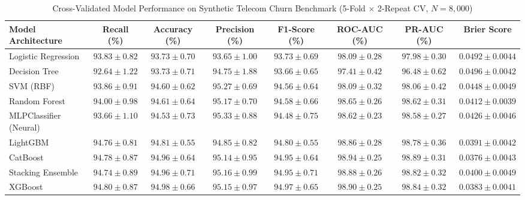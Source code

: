 \begin{table}[t]
\caption{Cross-Validated Model Performance on Synthetic Telecom Churn Benchmark (5-Fold $\times$ 2-Repeat CV, $N=8,000$)}
\label{tab:phase2_metrics}
\centering
\begin{tabular}{lccccccc}
\toprule
\textbf{Model Architecture} & \textbf{Recall (\%)} & \textbf{Accuracy (\%)} & \textbf{Precision (\%)} & \textbf{F1-Score (\%)} & \textbf{ROC-AUC (\%)} & \textbf{PR-AUC (\%)} & \textbf{Brier Score} \\
\midrule
Logistic Regression         & $93.83 \pm 0.82$ & $93.73 \pm 0.70$ & $93.65 \pm 1.00$ & $93.73 \pm 0.69$ & $98.09 \pm 0.28$ & $97.98 \pm 0.30$ & $0.0492 \pm 0.0044$ \\
Decision Tree               & $92.64 \pm 1.22$ & $93.73 \pm 0.71$ & $94.75 \pm 1.88$ & $93.66 \pm 0.65$ & $97.41 \pm 0.42$ & $96.48 \pm 0.62$ & $0.0496 \pm 0.0042$ \\
SVM (RBF)                   & $93.86 \pm 0.91$ & $94.60 \pm 0.62$ & $95.27 \pm 0.69$ & $94.56 \pm 0.64$ & $98.09 \pm 0.32$ & $98.06 \pm 0.42$ & $0.0448 \pm 0.0049$ \\
Random Forest               & $94.00 \pm 0.98$ & $94.61 \pm 0.64$ & $95.17 \pm 0.70$ & $94.58 \pm 0.66$ & $98.65 \pm 0.26$ & $98.62 \pm 0.31$ & $0.0412 \pm 0.0039$ \\
MLPClassifier (Neural)      & $93.66 \pm 1.10$ & $94.53 \pm 0.73$ & $95.33 \pm 0.88$ & $94.48 \pm 0.75$ & $98.62 \pm 0.23$ & $98.58 \pm 0.27$ & $0.0426 \pm 0.0046$ \\
LightGBM                    & $94.76 \pm 0.81$ & $94.81 \pm 0.55$ & $94.85 \pm 0.82$ & $94.80 \pm 0.55$ & $98.86 \pm 0.28$ & $98.78 \pm 0.36$ & $0.0391 \pm 0.0042$ \\
CatBoost                    & $94.78 \pm 0.87$ & $94.96 \pm 0.64$ & $95.14 \pm 0.95$ & $94.95 \pm 0.64$ & $\mathbf{98.94 \pm 0.25}$ & $\mathbf{98.89 \pm 0.31}$ & $\mathbf{0.0376 \pm 0.0043}$ \\
Stacking Ensemble           & $94.74 \pm 0.89$ & $94.96 \pm 0.71$ & $95.16 \pm 0.99$ & $94.95 \pm 0.71$ & $98.88 \pm 0.26$ & $98.82 \pm 0.32$ & $0.0400 \pm 0.0049$ \\
XGBoost                     & $\mathbf{94.80 \pm 0.87}$ & $\mathbf{94.98 \pm 0.66}$ & $\mathbf{95.15 \pm 0.97}$ & $\mathbf{94.97 \pm 0.65}$ & $98.90 \pm 0.25$ & $98.84 \pm 0.32$ & $0.0383 \pm 0.0041$ \\
\bottomrule
\end{tabular}
\end{table}
